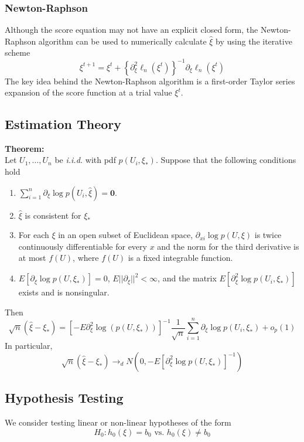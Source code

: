 \documentclass[12pt]{article}
\newcommand{\sumn}{\sum_{i=1}^n}
\numberwithin{equation}{section}
\begin{document}
\subsubsection{Newton-Raphson}
Although the score equation may not have an explicit closed form, the Newton-Raphson algorithm can be used to numerically calculate $\hat{\xi}$ by using the iterative scheme
%
\begin{equation*}
  \xi^{t+1} = \xi^t + \left\{ \partial_{\xi}^2 \ell_n(\xi^t) \right\}^{-1} \partial_{\xi} \ell_n(\xi^t)
\end{equation*}
%
The key idea behind the Newton-Raphson algorithm is a first-order Taylor series expansion of the score function at a trial value $\xi^{t}$.

\subsection{Estimation Theory}
\textbf{Theorem:} \\
Let $U_1, \ldots, U_n$ be \textit{i.i.d.} with pdf $p(U_i, \xi_*)$. Suppose that the following conditions hold
\begin{enumerate}
  \item $\sumn \partial_{\xi} \log p(U_i, \hat{\xi}) = \mathbf{0}$.
  \item $\hat{\xi}$ is consistent for $\xi_*$
  \item For each $\xi$ in an open subset of Euclidean space, $\partial_{xi} \log p(U, \xi)$ is twice continuously differentiable for every $x$ and the norm for the third derivative is at most $f(U)$, where $f(U)$ is a fixed integrable function.
  \item $E[\partial_{\xi} \log p(U, \xi_*)] = 0$, 
  $E||\partial_{\xi}||^2 < \infty$, and the matrix $E[\partial_{\xi}^2 \log p(U_i, \xi_*)]$ exists and is nonsingular.
\end{enumerate}
Then
\begin{equation*}
  \sqrt{n}(\hat{\xi} - \xi_*) = %
    [-E\partial^2_{\xi} \log(p(U, \xi_*))]^{-1} \frac{1}{\sqrt{n}} %
      \sumn \partial_{\xi} \log p(U_i, \xi_*) + o_p(1)
\end{equation*}
In particular,
\begin{equation*}
  \sqrt{n}(\hat{\xi} - \xi_*) \to_{d} N(0, -E[\partial_{\xi}^2 \log p(U, \xi_*)]^{-1})
\end{equation*}

\subsection{Hypothesis Testing}
We consider testing linear or non-linear hypotheses of the form
\begin{equation*}
  H_0: h_0(\xi) = b_0 \text{ vs. } h_0(\xi) \ne b_0
\end{equation*}
\end{document}
